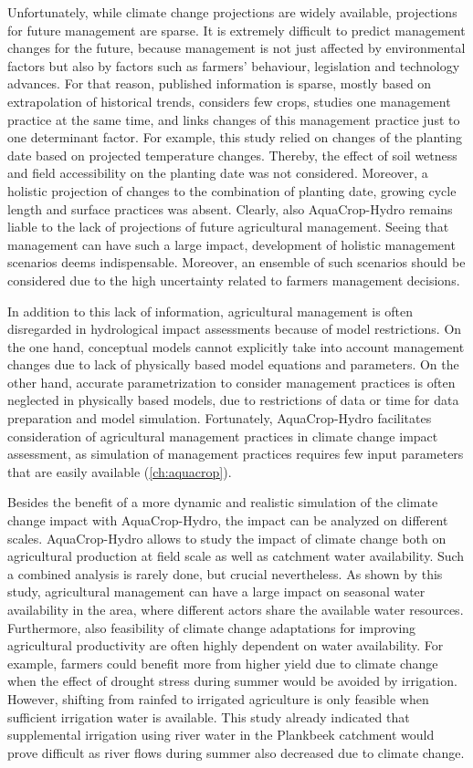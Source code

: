 Unfortunately, while climate change projections are widely available, projections for future management are sparse. It is extremely difficult to predict management changes for the future, because management is not just affected by environmental factors but also by factors such as farmers' behaviour, legislation and technology advances. For that reason, published information is sparse, mostly based on extrapolation of historical trends, considers few crops, studies one management practice at the same time, and links changes of this management practice just to one determinant factor. For example, this study relied on changes of the planting date based on projected temperature changes. Thereby, the effect of soil wetness and field accessibility on the planting date was not considered. Moreover, a holistic projection of changes to the combination of planting date, growing cycle length and surface practices was absent. Clearly, also AquaCrop-Hydro remains liable to the lack of projections of future agricultural management. Seeing that management can have such a large impact, development of holistic management scenarios deems indispensable. Moreover, an ensemble of such scenarios should be considered due to the high uncertainty related to farmers management decisions.
 
In addition to this lack of information, agricultural management is often disregarded in hydrological impact assessments because of model restrictions. On the one hand, conceptual models cannot explicitly take into account management changes due to lack of physically based model equations and parameters. On the other hand, accurate parametrization to consider management practices is often neglected in physically based models, due to restrictions of data or time for data preparation and model simulation. Fortunately, AquaCrop-Hydro facilitates consideration of agricultural management practices in climate change impact assessment, as simulation of management practices requires few input parameters that are easily available (\autoref{ch:aquacrop}). 

Besides the benefit of a more dynamic and realistic simulation of the climate change impact with AquaCrop-Hydro, the impact can be analyzed on different scales. AquaCrop-Hydro allows to study the impact of climate change both on agricultural production at field scale as well as catchment water availability. Such a combined analysis is rarely done, but crucial nevertheless. As shown by this study, agricultural management can have a large impact on seasonal water availability in the area, where different actors share the available water resources. Furthermore, also feasibility of climate change adaptations for improving agricultural productivity are often highly dependent on water availability. For example, farmers could benefit more from higher yield due to climate change when the effect of drought stress during summer would be avoided by irrigation. However, shifting from rainfed to irrigated agriculture is only feasible when sufficient irrigation water is available. This study already indicated that supplemental irrigation using river water in the Plankbeek catchment would prove difficult as river flows during summer also decreased due to climate change.

